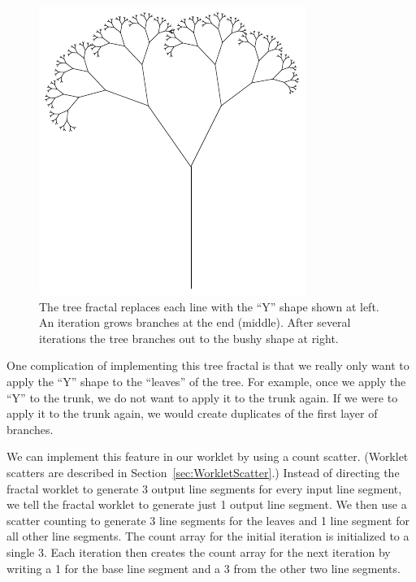 \begin{figure}[htb]
  \includegraphics[scale=1]{images/Tree08}
  \caption[The tree fractal.]{
    The tree fractal replaces each line with the ``Y'' shape shown at left.
    An iteration grows branches at the end (middle).
    After several iterations the tree branches out to the bushy shape at right.
  }
  \label{fig:TreeFractal}
\end{figure}

One complication of implementing this tree fractal is that we really only want to apply the ``Y'' shape to the ``leaves'' of the tree.
For example, once we apply the ``Y'' to the trunk, we do not want to apply it to the trunk again.
If we were to apply it to the trunk again, we would create duplicates of the first layer of branches.

We can implement this feature in our worklet by using a count scatter.
(Worklet scatters are described in Section~\ref{sec:WorkletScatter}.)
Instead of directing the fractal worklet to generate 3 output line segments for every input line segment, we tell the fractal worklet to generate just 1 output line segment.
We then use a scatter counting to generate 3 line segments for the leaves and 1 line segment for all other line segments.
The count array for the initial iteration is initialized to a single 3.
Each iteration then creates the count array for the next iteration by writing a 1 for the base line segment and a 3 from the other two line segments.


\subsection{}

\subsection{}



